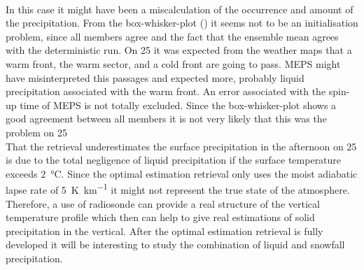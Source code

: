 \\
In this case it might have been a miscalculation of the occurrence and amount of the precipitation. From the box-whisker-plot () it seems not to be an initialisation problem, since all members agree and the fact that the ensemble mean agrees with the deterministic run. On \SI{25}{\dec} it was expected from the weather maps that a warm front, the warm sector, and a cold front are going to pass. MEPS might have misinterpreted this passages and expected more, probably liquid precipitation associated with the warm front. 
An error associated with the spin-up time of MEPS is not totally excluded. Since the box-whisker-plot shows a good agreement between all members it is not very likely that this was the problem on \SI{25}{\dec}
\\
That the retrieval underestimates the surface precipitation in the afternoon on \SI{25}{\dec} is due to the total negligence  of liquid precipitation if the surface temperature exceeds \SI{2}{\celsius}. Since the optimal estimation retrieval only uses the moist adiabatic lapse rate of \SI{5}{\kelvin\per\km} it might not represent the true state of the atmosphere. Therefore, a use of radiosonde can provide a real structure of the vertical temperature profile which then can help to give real estimations of solid precipitation in the vertical.
After the optimal estimation retrieval is fully developed it will be interesting to study the combination of liquid and snowfall precipitation. 
